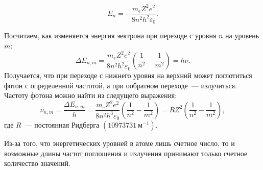 \begin{equation}
	E_n = -\frac{m_e Z^2 e^2}{8 n^2 h^2 \varepsilon_0}.
\end{equation}

Посчитаем, как изменяется энергия эектрона при переходе с уровня $n$ на уровень $m$:
\begin{equation}
	\Delta E_{n, m} = \frac{m_e Z^2 e^2}{8 n^2 h^2 \varepsilon_0} \left( \frac{1}{n^2} - \frac{1}{m^2}\right) = h \nu.
\end{equation}
Получается, что при переходе с нижнего уровня на верхний может поглотиться фотон с определенной частотой, а при ообратном переходе~--- излучиться. Частоту фотона можно найти из следущего выражения:
\begin{equation}
	\nu_{n, m} =
	\frac{\Delta E_{n, m}}{h} = \frac{m_e Z^2 e^2}{8 n^2 h^3 \varepsilon_0} \left( \frac{1}{n^2} - \frac{1}{m^2}\right) = R Z^2 \left(\frac{1}{n^2} - \frac{1}{m^2} \right),
\end{equation}
где $R$~--- постоянная Ридберга $(10973731~\text{м}^{-1})$.

Из-за того, что энергетических уровней в атоме лишь счетное число, то и возможные длины частот поглощения и излучения принимают только счетное количество значений.
